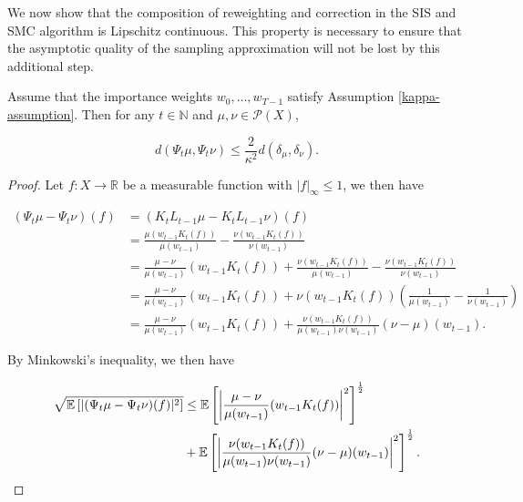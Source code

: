 We now show that the composition of reweighting and correction in the SIS and SMC algorithm is Lipschitz continuous. This property is necessary to ensure that the asymptotic quality of the sampling approximation will not be lost by this additional step.

\begin{lemma} \label{seq-bound}
  Assume that the importance weights $w_0, \ldots, w_{T-1}$ satisfy Assumption \ref{kappa-assumption}. Then for any $t \in \mathbb{N}$ and $\mu, \nu \in \mathcal{P}(X)$,

  \begin{equation*}
    d(\Psi_t\mu, \Psi_t\nu) \leq \frac2{\kappa^2}d(\delta_\mu, \delta_\nu).
  \end{equation*}
\end{lemma}

\begin{proof}
  Let $f : X \rightarrow \mathbb{R}$ be a measurable function with $|f|_\infty \le 1$, we then have

  \begin{equation*}
    \begin{aligned}
      (\Psi_t\mu - \Psi_t\nu)(f)
      &= (K_tL_{t-1}\mu - K_tL_{t-1}\nu)(f) \\
      &= \frac{\mu(w_{t-1}K_t(f))}{\mu(w_{t-1})} - \frac{\nu(w_{t-1}K_t(f))}{\nu(w_{t-1})} \\
      &= \frac{\mu - \nu}{\mu(w_{t-1})}(w_{t-1}K_t(f)) + \frac{\nu(w_{t-1}K_t(f))}{\mu(w_{t-1})} - \frac{\nu(w_{t-1}K_t(f))}{\nu(w_{t-1})}\\
      &= \frac{\mu - \nu}{\mu(w_{t-1})}(w_{t-1}K_t(f)) + \nu(w_{t-1}K_t(f))\left(\frac1{\mu(w_{t-1})} - \frac1{\nu(w_{t-1})}\right)\\
      &= \frac{\mu - \nu}{\mu(w_{t-1})}(w_{t-1}K_t(f)) + \frac{ \nu(w_{t-1}K_t(f))}{\mu(w_{t-1})\nu(w_{t-1})}(\nu - \mu)(w_{t-1}).
    \end{aligned}
  \end{equation*}
  
  By Minkowski's inequality, we then have

  \begin{equation*}
    \begin{aligned}
      \sqrt{\mathbb{E}\left[|(\Psi_t\mu - \Psi_t\nu)(f)|^2\right]}
      &\leq \mathbb{E}\left[\left|\frac{\mu - \nu}{\mu(w_{t-1})}(w_{t-1}K_t(f))\right|^2\right]^{\frac12}\\
      &+ \mathbb{E}\left[\left|\frac{ \nu(w_{t-1}K_t(f))}{\mu(w_{t-1})\nu(w_{t-1})}(\nu - \mu)(w_{t-1})\right|^2\right]^{\frac12}      .
    \end{aligned}
  \end{equation*}



\end{proof}
